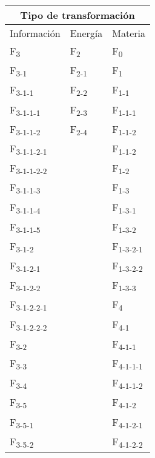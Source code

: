 \begin{center}
\begin{tabular}{ | m{2cm} | m{2cm} | m{2cm} | } 
 \hline
 \multicolumn{3}{|c|}{Tipo de transformaci\'on} \\
 \hline
 Informaci\'on & Energ\'ia & Materia\\
 \hline\hline
 F\textsubscript{3} & F\textsubscript{2} & F\textsubscript{0} \\
 \hline
 F\textsubscript{3-1} & F\textsubscript{2-1} & F\textsubscript{1} \\
 \hline
 F\textsubscript{3-1-1} & F\textsubscript{2-2} & F\textsubscript{1-1} \\
 \hline
 F\textsubscript{3-1-1-1} & F\textsubscript{2-3} & F\textsubscript{1-1-1} \\
 \hline
 F\textsubscript{3-1-1-2} & F\textsubscript{2-4} & F\textsubscript{1-1-2} \\
 \hline
 F\textsubscript{3-1-1-2-1} &  & F\textsubscript{1-1-2} \\
 \hline
 F\textsubscript{3-1-1-2-2} &  & F\textsubscript{1-2} \\
 \hline
 F\textsubscript{3-1-1-3} &  & F\textsubscript{1-3} \\
 \hline
 F\textsubscript{3-1-1-4} &  & F\textsubscript{1-3-1} \\
 \hline
 F\textsubscript{3-1-1-5} &  & F\textsubscript{1-3-2} \\
 \hline
 F\textsubscript{3-1-2} &  & F\textsubscript{1-3-2-1} \\
 \hline
 F\textsubscript{3-1-2-1} &  & F\textsubscript{1-3-2-2} \\
 \hline
 F\textsubscript{3-1-2-2} &  & F\textsubscript{1-3-3} \\
 \hline
 F\textsubscript{3-1-2-2-1} &  & F\textsubscript{4} \\
 \hline
 F\textsubscript{3-1-2-2-2} &  &  F\textsubscript{4-1} \\
 \hline
 F\textsubscript{3-2} &  &  F\textsubscript{4-1-1} \\
 \hline
 F\textsubscript{3-3} &  &  F\textsubscript{4-1-1-1} \\
 \hline
 F\textsubscript{3-4} &  &  F\textsubscript{4-1-1-2} \\
 \hline
 F\textsubscript{3-5} &  &  F\textsubscript{4-1-2} \\
 \hline
 F\textsubscript{3-5-1} &  & F\textsubscript{4-1-2-1} \\  
 \hline
 F\textsubscript{3-5-2} &  &  F\textsubscript{4-1-2-2} \\

\end{tabular}
\end{center}
